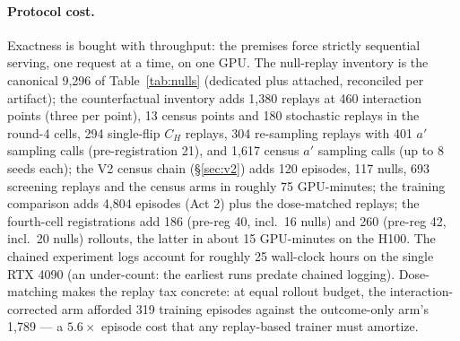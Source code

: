 \documentclass{article}
\theoremstyle{remark}
\begin{document}
\paragraph{Protocol cost.} Exactness is bought with throughput: the premises
force strictly sequential serving, one request at a time, on one GPU. The
null-replay inventory is the canonical 9{,}296 of
Table~\ref{tab:nulls} (dedicated plus attached, reconciled per artifact);
the counterfactual inventory adds 1{,}380 replays at 460 interaction
points (three per point), 13 census points and
180 stochastic replays in the round-4 cells, 294 single-flip $C_H$
replays, 304 re-sampling replays with 401 $a'$ sampling calls
(pre-registration 21), and 1{,}617 census $a'$ sampling calls (up to 8
seeds each); the V2 census chain (\S\ref{sec:v2}) adds 120 episodes, 117
nulls, 693 screening replays and the census arms in roughly 75 GPU-minutes;
the training
comparison adds 4{,}804 episodes (Act 2) plus the dose-matched replays;
the fourth-cell registrations add 186 (pre-reg 40, incl.\ 16 nulls) and
260 (pre-reg 42, incl.\ 20 nulls) rollouts, the latter in about 15
GPU-minutes on the H100. The
chained experiment logs account for roughly 25 wall-clock hours on the
single RTX 4090 (an under-count: the earliest runs predate chained logging).
Dose-matching makes the replay tax concrete: at equal rollout budget, the
interaction-corrected arm afforded 319 training episodes against the
outcome-only arm's 1{,}789 --- a $5.6\times$ episode cost that any
replay-based trainer must amortize.
\end{document}
